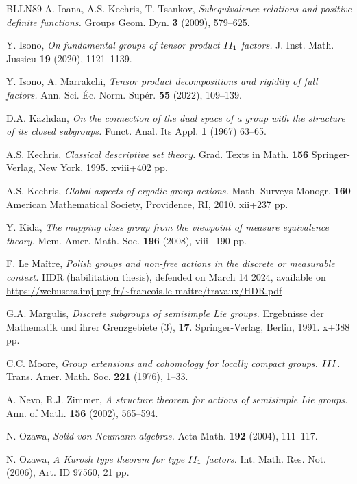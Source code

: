 \documentclass[11pt]{amsart}
\numberwithin{equation}{section}
\theoremstyle{plain}
\theoremstyle{definition}
\begin{document}
\begin{thebibliography}{BLLN89}
 {\sc A. Ioana, A.S. Kechris, T. Tsankov}, {\it Subequivalence relations and positive definite functions.} Groups Geom. Dyn. {\bf 3} (2009), 579--625.

 {\sc Y. Isono}, {\it On fundamental groups of tensor product ${\rm II_1}$ factors.} J. Inst. Math. Jussieu {\bf 19} (2020), 1121--1139. 

 {\sc Y. Isono, A. Marrakchi}, {\it Tensor product decompositions and rigidity of full factors.} Ann. Sci. \'Ec. Norm. Sup\'er. {\bf 55} (2022), 109--139.

 {\sc D.A. Kazhdan}, {\it On the connection of the dual space of a group with the structure of its closed subgroups.} Funct. Anal. Its Appl. {\bf 1} (1967) 63--65.  

 {\sc A.S. Kechris}, {\it Classical descriptive set theory.} Grad. Texts in Math. {\bf 156} Springer-Verlag, New York, 1995. xviii+402 pp.

 {\sc A.S. Kechris}, {\it Global aspects of ergodic group actions.} Math. Surveys Monogr. {\bf 160} American Mathematical Society, Providence, RI, 2010. xii+237 pp.

 {\sc Y. Kida}, {\it The mapping class group from the viewpoint of measure equivalence theory.} Mem. Amer. Math. Soc. {\bf 196} (2008), viii+190 pp.

 {\sc F. Le Ma\^itre}, {\it Polish groups and non-free actions in the discrete or measurable context.} HDR (habilitation thesis), defended on March 14 2024, available on \url{https://webusers.imj-prg.fr/~francois.le-maitre/travaux/HDR.pdf}

 {\sc G.A. Margulis}, {\it Discrete subgroups of semisimple Lie groups.} Ergebnisse der Mathematik und ihrer Grenzgebiete (3), {\bf 17}. Springer-Verlag, Berlin, 1991. x+388 pp. 

 {\sc C.C. Moore}, {\it Group extensions and cohomology for locally compact groups. ${\rm III}$.}
Trans. Amer. Math. Soc. {\bf 221} (1976), 1--33.

 {\sc A. Nevo, R.J. Zimmer}, {\it A structure theorem for actions of semisimple Lie groups.} Ann. of Math. {\bf 156} (2002), 565--594. 

 {\sc N. Ozawa}, {\it Solid von Neumann algebras.} Acta Math. {\bf 192} (2004), 111--117.

 {\sc N. Ozawa}, {\it A Kurosh type theorem for type $\rm II_1$ factors.} Int. Math. Res. Not. (2006), Art. ID 97560, 21 pp.


\end{thebibliography}
\end{document}
